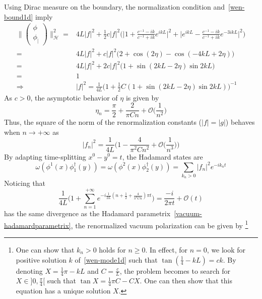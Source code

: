 Using Dirac measure on the boundary, 
the normalization condition and~\cref{wen-bound1d} imply
\begin{equation*}
\begin{split}
\Big\| \begin{pmatrix} \phi \\  \phi_| \end{pmatrix} \Big\|^2_{\mathcal{H}}  = &
4L |f|^2 + \frac 1 2 c |f|^2 \bigg( \Big| 1 + \frac{c^{-1} - ik}{c^{-1} + ik}e^{ikL} \Big|^2
+ \Big| e^{ikL} - \frac{c^{-1} - ik}{c^{-1} + ik}e^{-3ikL} \Big|^2
\bigg) \\
%
=& 4L |f|^2 + c |f|^2 \big(2 + \cos(2\eta) - \cos(-4kL + 2\eta) \big) \\
%
=& 4L |f|^2 +2 c |f|^2 \big(1 + \sin(2kL - 2\eta) \sin 2kL  \big) \\
= & 1 \\
\Rightarrow &
|f|^2 = \frac{1}{4L} \Big( 1 + \frac 1 2 C (1 + \sin(2kL-2\eta) \sin 2kL ) \Big)^{-1}
\end{split}
\end{equation*}
As $c> 0 $, the asymptotic behavior of $\eta$ is given by
\begin{equation*}
\eta_n = \frac \pi 2 + \frac{2}{\pi Cn} + \mathcal{O}\big(\frac{1}{n^2}\big)
\end{equation*}
Thus, the square of the norm of the renormalization constants ($|f| = |g|$) behaves when $n\rightarrow +\infty$ as
\begin{equation*}
|f_n|^2 = 
\frac{1}{4L}\Big( 1 - \frac{4}{\pi^2C n^2} + \mathcal{O}\big(\frac{1}{n^3}\big) \Big)
\end{equation*}
By adapting time-splitting $x^0 - y^0 = t$, the Hadamard states are
\begin{equation*}
\omega(\phi^1(x)\phi^\dagger_1(y)) = \omega(\phi^2(x)\phi^\dagger_2(y)) = 
 \sum_{k_n>0} |f_n|^2 e^{-ik_nt}
\end{equation*} 
Noticing that 
\begin{equation*}
\frac{ 1}{ 4L}\Big(1+\sum_{n=1}^{+\infty} e^{-i\frac{1}{2L}(n+\frac 1 2 + \frac{4}{\pi^2 C n} ) \pi t} \Big)
= \frac{-i}{2\pi t} + \mathcal{O}(t)
\end{equation*}
has the same divergence as the Hadamard parametrix~\cref{vacuum-hadamardparametrix}, the renormalized vacuum polarization can be given by
\footnote{
One can show that $k_n > 0$ holds for $n \geq 0$. In effect, for $n = 0$, we look for positive solution $k$ of~\cref{wen-mode1d} such that $\tan(\frac 1 4 - kL) = ck$. By denoting $X = \frac 1 4 \pi - kL$ and $C = \frac c L$, the problem becomes to search for $X \in ] 0, \frac \pi 4[$ such that $\tan X = \frac 1 4 \pi C - C X$. One can then show that this equation has a unique solution $X$.
}

